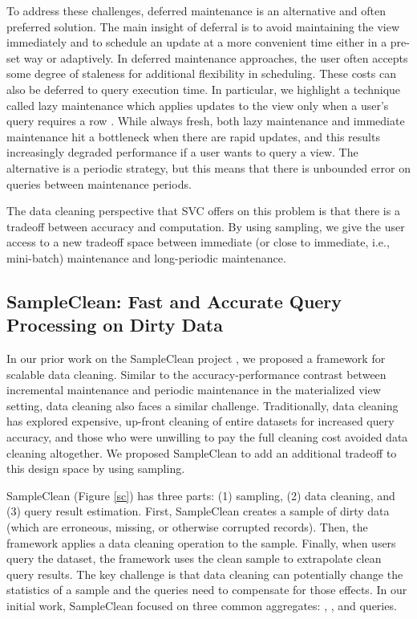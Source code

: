 To address these challenges, deferred maintenance is an alternative and often preferred solution.
The main insight of deferral is to avoid maintaining the view immediately and to schedule an update at a more convenient time either in a pre-set way or adaptively.
In deferred maintenance approaches, the user often accepts some degree of staleness for additional flexibility in scheduling.
These costs can also be deferred to query execution time.
In particular, we highlight a technique called lazy maintenance which applies updates to the view only when a user's query requires a row \cite{zhou2007lazy}.
While always fresh, both lazy maintenance and immediate maintenance hit a bottleneck when there are rapid updates, and this results increasingly degraded performance if a user wants to query a view.
The alternative is a periodic strategy, but this means that there is unbounded error on queries between maintenance periods.

The data cleaning perspective that SVC offers on this problem is that there is a tradeoff between accuracy and computation.
By using sampling, we give the user access to a new tradeoff space between immediate (or close to immediate, i.e., mini-batch) maintenance and long-periodic maintenance.

\subsection{SampleClean: Fast and Accurate Query Processing on Dirty Data}
In our prior work on the SampleClean project \cite{wang1999sample}, we proposed a framework for scalable data cleaning.
Similar to the accuracy-performance contrast between incremental maintenance and periodic maintenance in the materialized view setting, data cleaning also faces a similar challenge.
Traditionally, data cleaning has explored expensive, up-front cleaning of entire datasets for increased query accuracy, and those who were unwilling to pay the full cleaning cost avoided data cleaning altogether.
We proposed SampleClean to add an additional tradeoff to this design space by using sampling.

SampleClean (Figure \ref{sc}) has three parts: (1) sampling, (2) data cleaning, and (3) query result estimation.
First, SampleClean creates a sample of dirty data (which are erroneous, missing, or otherwise corrupted records).
Then, the framework applies a data cleaning operation to the sample.
Finally, when users query the dataset, the framework uses the clean sample to extrapolate clean query results.
The key challenge is that data cleaning can potentially change the statistics of a sample and the queries need to compensate for those effects.
In our initial work, SampleClean focused on three common aggregates: \sumfunc, \avgfunc, and \countfunc queries.

